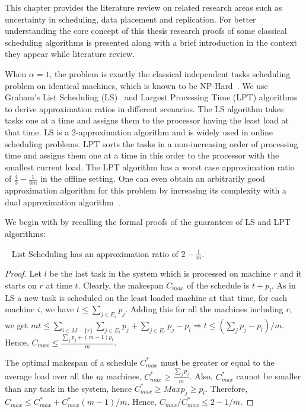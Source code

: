 \label{ch3}
\label{Intro}
This chapter provides the literature review on related research areas such as uncertainty in scheduling, data placement and replication. For better understanding the core concept of this thesis research proofs of some classical scheduling algorithms is presented along with a brief introduction in the context they appear while literature review.


 When $\alpha = 1$, the problem is exactly the classical independent
 tasks scheduling problem on identical machines, which is known to be
 NP-Hard~\cite{GareyJohnson79}. We use Graham's List Scheduling
 (LS)~\cite{Graham66} and Largest Processing Time (LPT)
 algorithms~\cite{Graham69boundson} to derive approximation ratios in
 different scenarios. The LS algorithm takes tasks one at a time and
 assigns them to the processor having the least load at that time. LS is a
 2-approximation algorithm and is widely used in online scheduling
 problems. LPT sorts the tasks in a non-increasing order of processing time and
 assigns them one at a time in this order to the processor with the
 smallest current load. The LPT algorithm has a worst case approximation
 ratio of $\frac{4}{3}-\frac{1}{3m}$ in the offline setting. One can
 even obtain an arbitrarily good approximation algorithm for this problem by increasing
 its complexity with a dual approximation
 algorithm~\cite{Hoch87}. 
 
 We begin with by recalling the formal proofs of the guarantees of LS and LPT algorithms:
 \begin{property}~\citet{Graham66} List Scheduling has an approximation ratio of $2-\frac{1}{m}$.
 \end{property}
 \begin{proof}
 Let $l$ be the last task in the system which is processed on machine $r$ and it starts on $r$ at time $t$. Clearly, the makespan $C_{max}$ of the schedule is $t+p_l$. As in LS a new task is scheduled on the least loaded machine at that time, for each machine $i$, we have $t\leq \sum\limits
 _{j \in E_i}p_j$. Adding this for all the machines including  $r$, we get $m t\leq \sum\limits_{i\in M-\{r\}}\sum\limits_{j \in E_i}p_j +\sum\limits_{j \in E_r}p_j - p_l\Rightarrow t\leq (\sum\limits_{j}p_j - p_l)/ m $. Hence, $C_{max}\leq \frac{\sum_{j}p_j + (m-1)p_l}{m}$.
  
 The optimal makespan of a schedule $C^*_{max}$ must be greater or equal to the average load over all the $m$ machines, $C^*_{max}\geq \frac{\sum_{j}p_j}{m}$. Also, $C^*_{max}$ cannot be smaller than any task in the system, hence $C^*_{max}\geq Max p_j \geq p_l$.  Therefore,  $C_{max} \leq C^*_{max}+C^*_{max}(m-1)/m $. Hence, $C_{max}/C^*_{max} \leq 2-1/m$.
  \end{proof}
  
